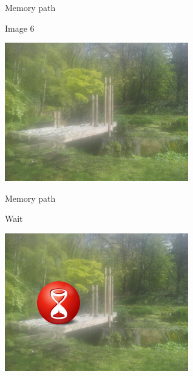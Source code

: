 \begin{frame}{Memory path}
  \begin{block}{Image 6}
    \begin{center}
      \includegraphics[height=6cm]{img/loci/06.jpg}
    \end{center}
  \end{block}
\end{frame}
\begin{frame}{Memory path}
  \begin{block}{Wait}
    \begin{center}
      \includegraphics[height=6cm]{img/loci/06-wait.jpg}
    \end{center}
  \end{block}
\end{frame}

